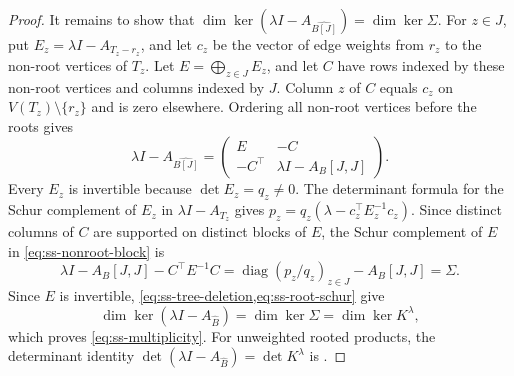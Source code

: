 \documentclass[11pt,a4paper]{article}
\theoremstyle{plain}
\theoremstyle{definition}
\DeclareMathOperator{\diag}{diag}
\begin{document}
\begin{proof}
It remains to show that
$\dim\ker(\lambda I-A_{\widehat{B[J]}})=\dim\ker \Sigma$.
For $z\in J$, put $E_z=\lambda I-A_{T_z-r_z}$, and let
$c_z$ be the vector of edge weights from $r_z$ to the non-root vertices
of $T_z$.
Let $E=\bigoplus_{z\in J}E_z$, and let $C$ have rows indexed by these
non-root vertices and columns indexed by $J$.
Column $z$ of $C$ equals $c_z$ on $V(T_z)\setminus\{r_z\}$ and is
zero elsewhere.
Ordering all non-root vertices before the roots gives
\begin{equation}\label{eq:ss-nonroot-block}
 \lambda I-A_{\widehat{B[J]}}=
 \begin{pmatrix}E&-C\\-C^{\top}&\lambda I-A_{B}[J,J]\end{pmatrix}.
\end{equation}
Every $E_z$ is invertible because $\det E_z=q_z\ne0$.
The determinant formula for the Schur complement of $E_z$ in
$\lambda I-A_{T_z}$ gives
$p_z=q_z(\lambda-c_z^{\top}E_z^{-1}c_z)$.
Since distinct columns of $C$ are supported on distinct blocks of $E$,
the Schur complement of $E$ in \cref{eq:ss-nonroot-block} is
\begin{equation}\label{eq:ss-root-schur}
 \lambda I-A_{B}[J,J]-C^{\top}E^{-1}C
 =\diag(p_z/q_z)_{z\in J}-A_{B}[J,J]=\Sigma.
\end{equation}
Since $E$ is invertible, \cref{eq:ss-tree-deletion,eq:ss-root-schur} give
\begin{equation}\label{eq:ss-kernel-reduction}
 \dim\ker(\lambda I-A_{\widehat B})
 =\dim\ker \Sigma
 =\dim\ker K^\lambda,
\end{equation}
which proves \cref{eq:ss-multiplicity}.
For unweighted rooted products, the determinant identity
$\det(\lambda I-A_{\widehat B})=\det K^\lambda$
is \cite[Theorem~2.1]{GodsilMcKay1978}.
\end{proof}
\end{document}
